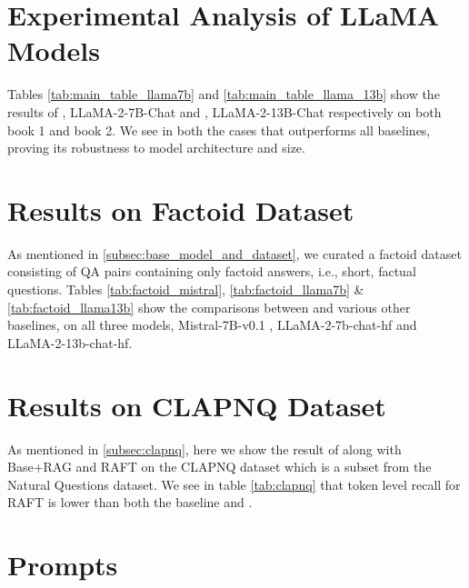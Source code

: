 \section{Experimental Analysis of LLaMA Models}

Tables \ref{tab:main_table_llama7b} and \ref{tab:main_table_llama_13b} show the results of , LLaMA-2-7B-Chat and , LLaMA-2-13B-Chat respectively on both book 1 and book 2. We see in both the cases that \ourmethodshort  \hspace{0.1cm} outperforms all baselines, proving its robustness to model architecture and size. 




\newpage
\section{Results on Factoid Dataset}
\label{subsec:appendix_factoid}

As mentioned in \ref{subsec:base_model_and_dataset}, we curated a factoid dataset consisting of QA pairs containing only factoid answers, i.e., short, factual questions. Tables \ref{tab:factoid_mistral}, \ref{tab:factoid_llama7b} \& \ref{tab:factoid_llama13b} show the comparisons between \ourmethodshort  \hspace{0.1cm} and various other baselines, on all three models, Mistral-7B-v0.1 , LLaMA-2-7b-chat-hf  and LLaMA-2-13b-chat-hf. 







\section{Results on CLAPNQ Dataset}
As mentioned in \ref{subsec:clapnq}, here we show the result of \ourmethodshort \hspace{0.1pt} along with Base+RAG and RAFT on the CLAPNQ dataset which is a subset from the Natural Questions dataset.
We see in table \ref{tab:clapnq} that token level recall for RAFT is lower than both the baseline and \ourmethodshort. 



\section{Prompts}
\label{subsec: appendix_prompts}

